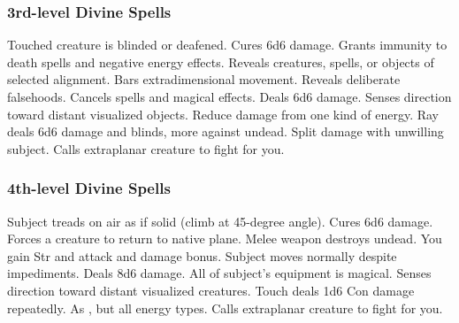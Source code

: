 \subsubsection{3rd-level Divine Spells}
\begin{spelllist}
   Touched creature is blinded or deafened.
   Cures 6d6 damage.
   Grants immunity to death spells and negative energy effects.
   Reveals creatures, spells, or objects of selected alignment.
   Bars extradimensional movement.
   Reveals deliberate falsehoods.
   Cancels spells and magical effects.
   Deals 6d6 damage.
   Senses direction toward distant visualized objects.
   Reduce damage from one kind of energy.
   Ray deals 6d6 damage and blinds, more against undead.
    Split damage with unwilling subject.
   Calls extraplanar creature to fight for you.
\end{spelllist}

\subsubsection{4th-level Divine Spells}
\begin{spelllist}
   Subject treads on air as if solid (climb at 45-degree angle).
   Cures 6d6 damage.
   Forces a creature to return to native plane.
   Melee weapon destroys undead.
   You gain  Str and attack and damage bonus.
   Subject moves normally despite impediments.
   Deals 8d6 damage.
   All of subject's equipment is magical.
   Senses direction toward distant visualized creatures.
   Touch deals 1d6 Con damage repeatedly.
   As , but all energy types.
   Calls extraplanar creature to fight for you.
\end{spelllist}

